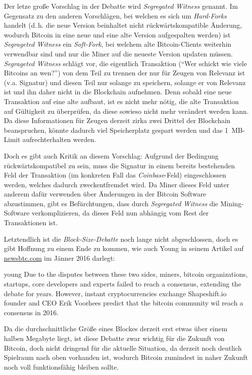 Der letze große Vorschlag in der Debatte wird \emph{Segregated Witness} genannt.
Im Gegensatz zu den anderen Vorschlägen, bei welchen es sich um \emph{Hard-Forks} handelt (d.\,h. die neue Version beinhaltet nicht rückwärtskompatible Änderung, wodurch Bitcoin in eine neue und eine alte Version aufgespalten werden) ist \emph{Segrageted Witness} ein \emph{Soft-Fork}, bei welchem alte Bitcoin-Clients weiterhin verwendbar sind und nur die Miner auf die neueste Version updaten müssen.
\emph{Segrageted Witness} schlägt vor, die eigentlich Transaktion ("`Wer schickt wie viele Bitcoins an wen?"') von dem Teil zu trennen der nur für Zeugen von Relevanz ist (v.a. Signatur) und diesen Teil nur solange zu speichern, solange er von Relevanz ist und ihn daher nicht in die Blockchain aufnehmen.
Denn sobald eine neue Transaktion auf eine alte aufbaut, ist es nicht mehr nötig, die alte Transaktion auf Gültigkeit zu überprüfen, da diese sowieso nicht mehr verändert werden kann.
Da diese Informationen für Zeugen derzeit zirka zwei Drittel der Blockchain beanspruchen, könnte dadurch viel Speicherplatz gespart werden und das 1~MB-Limit aufrechterhalten werden.

Doch es gibt auch Kritik an diesem Vorschlag:
Aufgrund der Bedingung rückwärtskompatibel zu sein, muss die Signatur in einem bereits bestehenden Feld der Transaktion (im konkreten Fall das \emph{Coinbase}-Feld) eingeschlossen werden, welches dadurch zweckentfremdet wird.
Da Miner dieses Feld unter anderem dafür verwenden über Änderungen in der Bitcoin Software abzustimmen, gibt es Befürchtungen, dass durch \emph{Segregated Witness} die Mining-Software verkomplizieren, da dieses Feld nun abhängig vom Rest der Transaktionen ist.

Letztendlich ist die \emph{Block-Size-Debatte} noch lange nicht abgeschlossen, doch es gibt Hoffnung zu einem Ende zu kommen, wie auch Young in seinem Artikel auf \url{newsbtc.com} im Jänner 2016 darlegt:

\begin{longquote}{young}
Due to the disputes between these two sides, miners, bitcoin organizations, startups, core developers and experts failed to reach a consensus, extending the debate for years.
However, instant cryptocurrencies exchange Shapeshift.io founder and CEO Erik Voorhees predict that the bitcoin community wil reach a consensus in 2016.
\end{longquote}

Da die durchschnittliche Größe eines Blockes derzeit erst etwas über einem halben Megabyte liegt, ist diese Debatte zwar wichtig für die Zukunft von Bitcoin, doch nicht dringend für die aktuelle Situation, da derzeit noch deutlich Spielraum nach oben vorhanden ist, wodurch Bitcoin zumindest in naher Zukunft noch voll funktionsfähig bleiben sollte.
